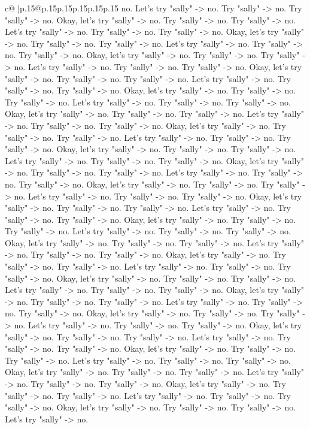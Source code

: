 \documentclass{article}
\begin{document}
{\begin{supertabular}{c@{$\;$}|p{.15\linewidth}@{}p{.15\linewidth}p{.15\linewidth}p{.15\linewidth}p{.15\linewidth}p{.15\linewidth}}
{{{no. Let's try "sally" {-}> no. Try "sally" {-}> no. Try "sally" {-}> no. Okay, let's try "sally" {-}> no. Try "sally" {-}> no. Try "sally" {-}> no. Let's try "sally" {-}> no. Try "sally" {-}> no. Try "sally" {-}> no. Okay, let's try "sally" {-}> no. Try "sally" {-}> no. Try "sally" {-}> no. Let's try "sally" {-}> no. Try "sally" {-}> no. Try "sally" {-}> no. Okay, let's try "sally" {-}> no. Try "sally" {-}> no. Try "sally" {-}> no. Let's try "sally" {-}> no. Try "sally" {-}> no. Try "sally" {-}> no. Okay, let's try "sally" {-}> no. Try "sally" {-}> no. Try "sally" {-}> no. Let's try "sally" {-}> no. Try "sally" {-}> no. Try "sally" {-}> no. Okay, let's try "sally" {-}> no. Try "sally" {-}> no. Try "sally" {-}> no. Let's try "sally" {-}> no. Try "sally" {-}> no. Try "sally" {-}> no. Okay, let's try "sally" {-}> no. Try "sally" {-}> no. Try "sally" {-}> no. Let's try "sally" {-}> no. Try "sally" {-}> no. Try "sally" {-}> no. Okay, let's try "sally" {-}> no. Try "sally" {-}> no. Try "sally" {-}> no. Let's try "sally" {-}> no. Try "sally" {-}> no. Try "sally" {-}> no. Okay, let's try "sally" {-}> no. Try "sally" {-}> no. Try "sally" {-}> no. Let's try "sally" {-}> no. Try "sally" {-}> no. Try "sally" {-}> no. Okay, let's try "sally" {-}> no. Try "sally" {-}> no. Try "sally" {-}> no. Let's try "sally" {-}> no. Try "sally" {-}> no. Try "sally" {-}> no. Okay, let's try "sally" {-}> no. Try "sally" {-}> no. Try "sally" {-}> no. Let's try "sally" {-}> no. Try "sally" {-}> no. Try "sally" {-}> no. Okay, let's try "sally" {-}> no. Try "sally" {-}> no. Try "sally" {-}> no. Let's try "sally" {-}> no. Try "sally" {-}> no. Try "sally" {-}> no. Okay, let's try "sally" {-}> no. Try "sally" {-}> no. Try "sally" {-}> no. Let's try "sally" {-}> no. Try "sally" {-}> no. Try "sally" {-}> no. Okay, let's try "sally" {-}> no. Try "sally" {-}> no. Try "sally" {-}> no. Let's try "sally" {-}> no. Try "sally" {-}> no. Try "sally" {-}> no. Okay, let's try "sally" {-}> no. Try "sally" {-}> no. Try "sally" {-}> no. Let's try "sally" {-}> no. Try "sally" {-}> no. Try "sally" {-}> no. Okay, let's try "sally" {-}> no. Try "sally" {-}> no. Try "sally" {-}> no. Let's try "sally" {-}> no. Try "sally" {-}> no. Try "sally" {-}> no. Okay, let's try "sally" {-}> no. Try "sally" {-}> no. Try "sally" {-}> no. Let's try "sally" {-}> no. Try "sally" {-}> no. Try "sally" {-}> no. Okay, let's try "sally" {-}> no. Try "sally" {-}> no. Try "sally" {-}> no. Let's try "sally" {-}> no. Try "sally" {-}> no. Try "sally" {-}> no. Okay, let's try "sally" {-}> no. Try "sally" {-}> no. Try "sally" {-}> no. Let's try "sally" {-}> no. Try "sally" {-}> no. Try "sally" {-}> no. Okay, let's try "sally" {-}> no. Try "sally" {-}> no. Try "sally" {-}> no. Let's try "sally" {-}> no. Try "sally" {-}> no. Try "sally" {-}> no. Okay, let's try "sally" {-}> no. Try "sally" {-}> no. Try "sally" {-}> no. Let's try "sally" {-}> no. Try "sally" {-}> no. Try "sally" {-}> no. Okay, let's try "sally" {-}> no. Try "sally" {-}> no. Try "sally" {-}> no. Let's try "sally" {-}> no. Try "sally" {-}> no. Try "sally" {-}> no. Okay, let's try "sally" {-}> no. Try "sally" {-}> no. Try "sally" {-}> no. Let's try "sally" {-}> no. }}}
\end{supertabular}}
\end{document}
